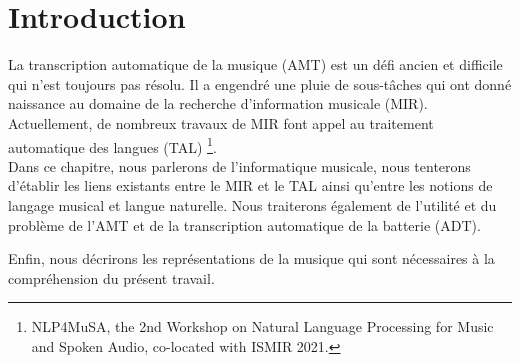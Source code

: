 \section*{Introduction}
La transcription automatique de la musique (AMT) est un défi ancien 
\cite{first_one} et difficile qui n’est toujours pas résolu. Il a engendré une 
pluie de sous-tâches qui ont donné naissance au domaine de la recherche 
d’information musicale (MIR). 
Actuellement, de nombreux travaux de MIR font appel au traitement automatique des langues (TAL) \footnote{NLP4MuSA, the 2nd Workshop on Natural Language Processing for Music and Spoken Audio, 
co-located with ISMIR 2021.}.\\

Dans ce chapitre, nous parlerons de l’informatique musicale, nous tenterons 
d’établir les liens existants entre le MIR et le TAL ainsi qu’entre les notions 
de langage musical et langue naturelle. Nous traiterons également 
de l’utilité et du problème de l’AMT et de la transcription automatique de la batterie (ADT).

Enfin, nous décrirons les représentations de la musique qui sont nécessaires à 
la compréhension du présent travail.

